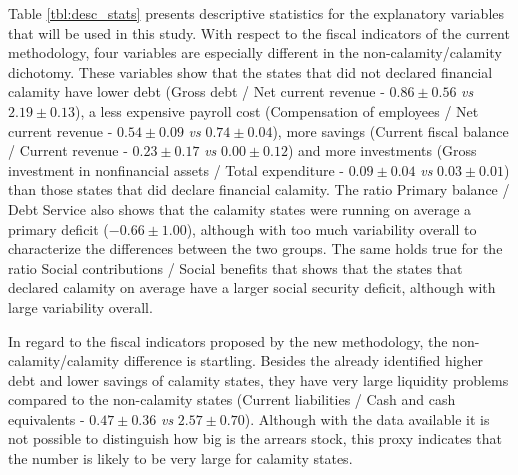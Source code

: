 Table \ref{tbl:desc_stats} presents descriptive statistics for the explanatory variables that will be used in this study. With respect to the fiscal indicators of the current methodology, four variables are especially different in the non-calamity/calamity dichotomy.  These variables show that the states that did not declared financial calamity have lower debt (Gross debt / Net current revenue - $0.86 \pm 0.56$ \textit{vs} $2.19 \pm 0.13$), a less expensive payroll cost (Compensation of employees / Net current revenue - $0.54 \pm 0.09$ \textit{vs} $0.74 \pm 0.04$), more savings (Current fiscal balance / Current revenue - $0.23 \pm 0.17$ \textit{vs} $0.00 \pm 0.12$) and more investments (Gross investment in nonfinancial assets / Total expenditure - $0.09 \pm 0.04$ \textit{vs} $0.03 \pm 0.01$) than those states that did declare financial calamity. The ratio Primary balance / Debt Service also shows that the calamity states were running on average a primary deficit ($-0.66 \pm 1.00$), although with too much variability overall to characterize the differences between the two groups. The same holds true for the ratio Social contributions / Social benefits that shows that the states that declared calamity on average have a larger social security deficit, although with large variability overall.

In regard to the fiscal indicators proposed by the new methodology, the non-calamity/calamity difference is startling. Besides the already identified higher debt and lower savings of calamity states, they have very large liquidity problems compared to the non-calamity states (Current liabilities / Cash and cash equivalents - $0.47 \pm 0.36$ \textit{vs} $2.57 \pm 0.70$). Although with the data available it is not possible to distinguish how big is the arrears stock, this proxy indicates that the number is likely to be very large for calamity states.

